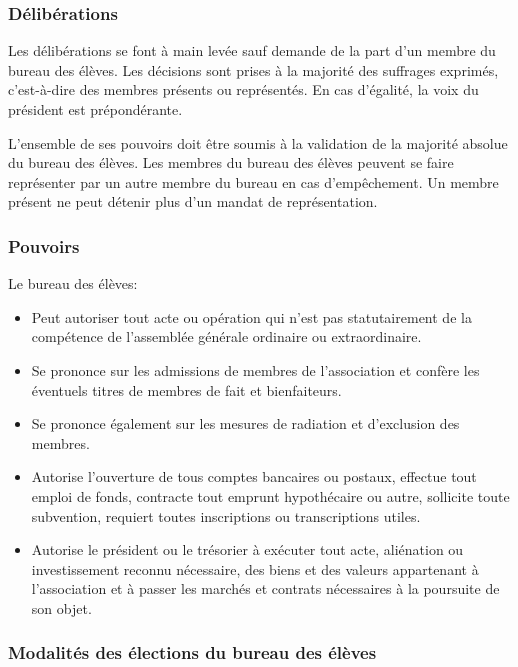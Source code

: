 \documentclass{article}
\begin{document}
			\subsubsection{Délibérations}
				Les délibérations se font à main levée sauf demande de la part
				d’un membre du bureau des élèves. Les décisions sont prises à la
				majorité des suffrages exprimés, c’est-à-dire des membres
				présents ou représentés. En cas d'égalité, la voix du président
				est prépondérante.

				L’ensemble de ses pouvoirs doit être soumis à la validation de
				la majorité absolue du bureau des élèves. Les membres du bureau
				des élèves peuvent se faire représenter par un autre membre du
				bureau en cas d’empêchement. Un membre présent ne peut détenir
				plus d’un mandat de représentation.

			\subsubsection{Pouvoirs}
				Le bureau des élèves:
				\begin{itemize}
					\item Peut autoriser tout acte ou opération qui n’est pas
					    statutairement de la compétence de l’assemblée générale
					    ordinaire ou extraordinaire.
					\item Se prononce sur les admissions de membres de
						l’association et confère les éventuels titres de membres
						de fait et bienfaiteurs.
					\item Se prononce également sur les mesures de radiation et
	    				d’exclusion des membres.
					\item Autorise l’ouverture de tous comptes bancaires ou
						postaux, effectue tout emploi de fonds, contracte tout
						emprunt hypothécaire ou autre, sollicite toute
						subvention, requiert toutes inscriptions ou
						transcriptions utiles.
					\item Autorise le président ou le trésorier à exécuter tout
						acte, aliénation ou investissement reconnu nécessaire,
						des biens et des valeurs appartenant à l’association et
						à passer les marchés et contrats nécessaires à la
						poursuite de son objet.
				\end{itemize}

			\subsubsection{Modalités des élections du bureau des élèves}
\label{ssub:modalites_des_elections_du_bureau_des_eleves}
			
\end{document}
